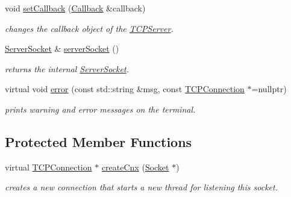 \begin{DoxyCompactItemize}
void \mbox{\hyperlink{classcppu_1_1_t_c_p_server_a94d3d97b03d5e3e48609e405d8dd7897}{set\+Callback}} (\mbox{\hyperlink{structcppu_1_1_t_c_p_server_1_1_callback}{Callback}} \&callback)
\begin{DoxyCompactList}\small\item\em changes the callback object of the \mbox{\hyperlink{classcppu_1_1_t_c_p_server}{T\+C\+P\+Server}}. \end{DoxyCompactList}\item 
\mbox{\label{classcppu_1_1_t_c_p_server_a6428b63a4440045050dba4f33bb454bf}} 
\mbox{\hyperlink{classcppu_1_1_server_socket}{Server\+Socket}} \& \mbox{\hyperlink{classcppu_1_1_t_c_p_server_a6428b63a4440045050dba4f33bb454bf}{server\+Socket}} ()
\begin{DoxyCompactList}\small\item\em returns the internal \mbox{\hyperlink{classcppu_1_1_server_socket}{Server\+Socket}}. \end{DoxyCompactList}\item 
\mbox{\label{classcppu_1_1_t_c_p_server_afc47ca4476d9c75d5ea88f73e2acd6d5}} 
virtual void \mbox{\hyperlink{classcppu_1_1_t_c_p_server_afc47ca4476d9c75d5ea88f73e2acd6d5}{error}} (const std\+::string \&msg, const \mbox{\hyperlink{classcppu_1_1_t_c_p_connection}{T\+C\+P\+Connection}} $\ast$=nullptr)
\begin{DoxyCompactList}\small\item\em prints warning and error messages on the terminal. \end{DoxyCompactList}\end{DoxyCompactItemize}
\subsection*{Protected Member Functions}
\begin{DoxyCompactItemize}
\item 
\mbox{\label{classcppu_1_1_t_c_p_server_abe314b95a31c88b479c81ec9bf123c65}} 
virtual \mbox{\hyperlink{classcppu_1_1_t_c_p_connection}{T\+C\+P\+Connection}} $\ast$ \mbox{\hyperlink{classcppu_1_1_t_c_p_server_abe314b95a31c88b479c81ec9bf123c65}{create\+Cnx}} (\mbox{\hyperlink{classcppu_1_1_socket}{Socket}} $\ast$)
\begin{DoxyCompactList}\small\item\em creates a new connection that starts a new thread for listening this socket. \end{DoxyCompactList}\end{DoxyCompactItemize}
